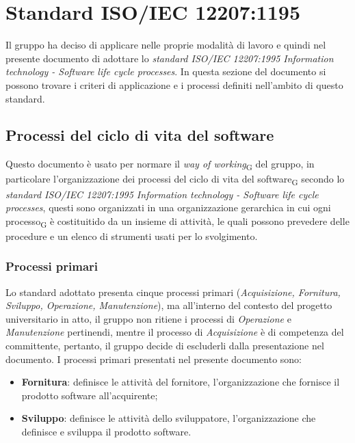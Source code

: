 \section{Standard ISO/IEC 12207:1195}
Il gruppo ha deciso di applicare nelle proprie modalità di lavoro e quindi nel presente documento di adottare lo \textit{standard ISO/IEC 12207:1995 Information technology - Software life cycle processes}. In questa sezione del documento si possono trovare i criteri di applicazione e i processi definiti nell'ambito di questo standard.
\subsection{Processi del ciclo di vita del software}
Questo documento è usato per normare il \textit{way of working}\textsubscript{G} del gruppo, in particolare l'organizzazione dei processi del ciclo di vita del software\textsubscript{G} secondo lo \textit{standard ISO/IEC 12207:1995 Information technology - Software life cycle processes}, questi sono organizzati in una organizzazione gerarchica in cui ogni processo\textsubscript{G} è costituitido da un insieme di attività, le quali possono prevedere delle procedure e un elenco di strumenti usati per lo svolgimento.
\subsubsection{Processi primari}
Lo standard adottato presenta cinque processi primari (\textit{Acquisizione, Fornitura, Sviluppo, Operazione, Manutenzione}), ma all’interno del contesto del progetto universitario in atto, il gruppo non ritiene i processi di \textit{Operazione} e \textit{Manutenzione} pertinendi, mentre il processo di \textit{Acquisizione} è di competenza del committente, pertanto, il gruppo decide di escluderli dalla presentazione nel documento.
I processi primari presentati nel presente documento sono:
\begin{itemize}
    \item \textbf{Fornitura}: definisce le attività del fornitore, l’organizzazione che fornisce il prodotto software all’acquirente;
    \item \textbf{Sviluppo}: definisce le attività dello sviluppatore, l’organizzazione che definisce e sviluppa il prodotto software.
\end{itemize}


